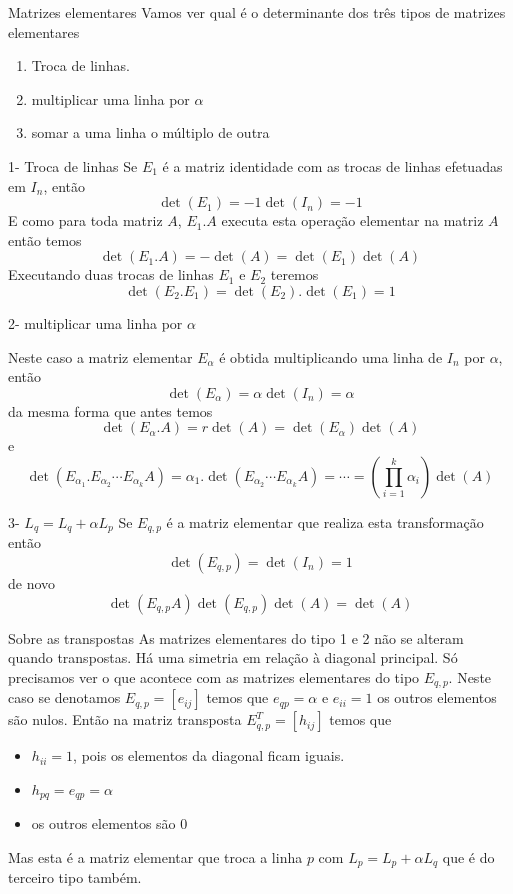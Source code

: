 \documentclass{beamer}
\begin{document}
\begin{frame}{Matrizes elementares}
  Vamos ver qual é o determinante dos três tipos de matrizes 
  elementares
  \begin{enumerate}
    \item Troca de linhas.
    \item multiplicar uma linha por $\alpha$
    \item somar a uma linha o múltiplo de outra
  \end{enumerate}
\end{frame}
\begin{frame}{1- Troca de linhas}
    Se $E_1$ é a matriz identidade com as trocas de linhas
    efetuadas em $I_n$, então 
    $$ \det(E_1) = -1\det(I_n) = -1 $$
    E como para toda matriz $A$, $E_1.A$ executa esta 
    operação elementar na matriz $A$ então temos
    $$ \det(E_1.A)=-\det(A)=\det(E_1)\det(A)$$
    Executando duas trocas de linhas $E_1$ e $E_2$
    teremos
    $$\det(E_2.E_1)=\det(E_2).\det(E_1) =1$$
  \end{frame}
  
  \begin{frame}{2- multiplicar uma linha por $\alpha$}

    Neste caso a matriz elementar $E_{\alpha}$ é obtida multiplicando uma linha de $I_n$ por
    $\alpha$, então
    $$\det(E_{\alpha})= \alpha\det(I_n)=\alpha $$
    da mesma forma que antes temos
    $$\det(E_\alpha.A)=r\det(A)=\det(E_\alpha)\det(A)$$
    e
    $$ \det(E_{\alpha_1}.E_{\alpha_2}\cdots E_{\alpha_k}A)=\alpha_1.\det(E_{\alpha_2}\cdots E_{\alpha_k}A)=\cdots = \left(\prod_{i=1}^k \alpha_i \right)\det(A)$$
    
  \end{frame}

  \begin{frame}{3- $L_q=L_q+ \alpha L_p$}
    Se $E_{q,p}$ é a matriz elementar que realiza esta transformação então
    $$ \det(E_{q,p})=\det(I_n)=1 $$
    de novo
    $$ \det(E_{q,p}A) \det(E_{q,p})\det(A)=\det(A)$$

  \end{frame}
  \begin{frame}{Sobre as transpostas}
    As matrizes elementares do tipo 1 e 2 não se alteram quando transpostas. Há uma simetria em relação à
    diagonal principal. Só precisamos ver o que acontece com as matrizes elementares do tipo $E_{q,p}$.
    Neste caso se denotamos $E_{q,p}=[e_{ij}]$ temos que $e_{qp}=\alpha$ e $e_{ii}=1$ os outros elementos são nulos.
    Então na matriz transposta $E_{q,p}^T=[h_{ij}]$ temos que 
    \begin{itemize}
      \item $h_{ii}=1$, pois os elementos da diagonal ficam iguais.
      \item $h_{pq}=e_{qp}=\alpha$
      \item os outros elementos são $0$
    \end{itemize}
    Mas esta é a matriz elementar que troca a linha $p$ com $L_p=L_p+\alpha L_q$ que é do terceiro tipo também.
  \end{frame}
\end{document}
